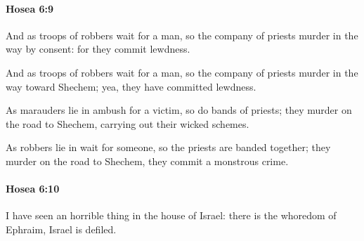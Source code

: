 		\paragraph{Hosea 6:9} %
			\label{HOSEA-6-9}

			And as troops of robbers wait for a man, so the company of priests murder in the way by consent: for they commit lewdness.

			\begin{versebox}
					\item[BHS] 
					\item[LXX] 
					\item[ASV] And as troops of robbers wait for a man, so the company of priests murder in the way toward Shechem; yea, they have committed lewdness.
					\item[NIV] As marauders lie in ambush for a victim, so do bands of priests; they murder on the road to Shechem, carrying out their wicked schemes.
					\item[NRSV] As robbers lie in wait for someone, so the priests are banded together; they murder on the road to Shechem, they commit a monstrous crime.
			\end{versebox}

		\paragraph{Hosea 6:10} %
			\label{HOSEA-6-10}

			I have seen an horrible thing in the house of Israel: there is the whoredom of Ephraim, Israel is defiled.

